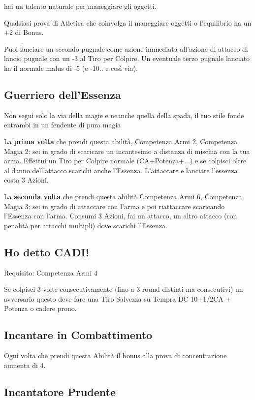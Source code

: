 \documentclass[a4paper,11pt,twoside,openany]{book}
\begin{document}
hai un talento naturale per maneggiare gli oggetti.

Qualsiasi prova di Atletica che coinvolga il maneggiare oggetti o l'equilibrio ha un +2 di Bonus.

Puoi lanciare un secondo pugnale come azione immediata all'azione di attacco di lancio pugnale con un -3 al Tiro per Colpire. Un eventuale terzo pugnale lanciato ha il normale malus di -5 (e -10.. e così via).

\subsection{Guerriero dell'Essenza}

Non segui solo la via della magie e neanche quella della spada, il tuo stile fonde entrambi in un fendente di pura magia

La \textbf{prima volta} che prendi questa abilità, Competenza Armi 2, Competenza Magia 2: sei in grado di scaricare un incantesimo a distanza di mischia con la tua arma. Effettui un Tiro per Colpire normale (CA+Potenza+...) e se colpisci oltre al danno dell'attacco scarichi anche l'Essenza. L'attaccare e lanciare l'essenza costa 3 Azioni.

La \textbf{seconda volta} che prendi questa abilità Competenza Armi 6, Competenza Magia 3: sei in grado di attaccare con l'arma e poi riattaccare scaricando l'Essenza con l'arma. Consumi 3 Azioni, fai un attacco, un altro attacco (con penalità per attacchi multipli) dove scarichi l'Essenza.

\subsection{Ho detto CADI!}

Requisito: Competenza Armi 4

Se colpisci 3 volte consecutivamente (fino a 3 round distinti ma consecutivi) un avversario questo deve fare una Tiro Salvezza su Tempra DC 10+1/2CA + Potenza o cadere prono.

\subsection{Incantare in Combattimento}

Ogni volta che prendi questa Abilità il bonus alla prova di concentrazione aumenta di 4.

\subsection{Incantatore Prudente}
\end{document}
